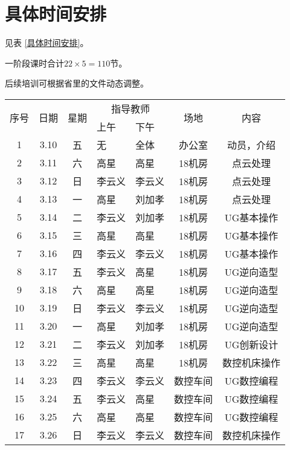 \documentclass[a4paper,zihao=-4,linespread=1.35]{ctexart}
\begin{document}
\section{具体时间安排} 
见表 \ref{具体时间安排}\/。\par
一阶段课时合计$22\times5=110$节。\par
后续培训可根据省里的文件动态调整。


\begin{table}[ht]
	\begin{center}

		\begin{tabular}{|c|c|c|l|l|c|c|}  
			\hline  
			\multirow{2}{*}{序号} 	&\multirow{2}{*}{日期	}&\multirow{2}{*}{星期}	&\multicolumn{2}{c|}{指导教师}	&\multirow{2}{*}{场地}	&\multirow{2}{*}{内容	}\\ \cline{4-5}
				& & &	上午	&下午	&&	\\\hline
			1	&3.10	&五	&无	&全体	&办公室	&动员，介绍	\\\hline
			2	&3.11	&六	&高星	&高星	&18机房	&点云处理	\\\hline
			3	&3.12	&日	&李云义	&李云义	&18机房	&点云处理	\\\hline
			4	&3.13	&一	&高星	&刘加孝	&18机房	&点云处理	\\\hline
			5	&3.14	&二	&李云义	&刘加孝	&18机房	&UG基本操作	\\\hline
			6	&3.15	&三	&高星	&高星	&18机房	&UG基本操作	\\\hline
			7	&3.16	&四	&李云义	&李云义	&18机房	&UG基本操作	\\\hline
			8	&3.17	&五	&李云义	&高星	&18机房	&UG逆向造型	\\\hline
			9	&3.18	&六	&高星	&高星	&18机房	&UG逆向造型	\\\hline
			10	&3.19	&日	&李云义	&李云义	&18机房	&UG逆向造型	\\\hline
			11	&3.20	&一	&高星	&刘加孝	&18机房	&UG逆向造型	\\\hline
			12	&3.21	&二	&李云义	&刘加孝	&18机房	&UG创新设计	\\\hline
			13	&3.22	&三	&高星	&高星	&18机房	&数控机床操作	\\\hline
			14	&3.23	&四	&李云义	&李云义	&数控车间	&UG数控编程	\\\hline
			15	&3.24	&五	&李云义	&高星	&数控车间	&UG数控编程	\\\hline
			16	&3.25	&六	&高星	&高星	&数控车间	&UG数控编程	\\\hline
			17	&3.26	&日	&李云义	&李云义	&数控车间	&数控机床操作	\\\hline

\end{tabular}
\end{center}
\end{table}
\end{document}

